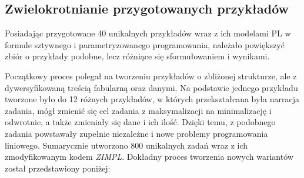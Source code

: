 \subsection{Zwielokrotnianie przygotowanych przykładów}

Posiadając przygotowane 40 unikalnych przykładów wraz z ich modelami PL w formule sztywnego i parametryzowanego programowania, należało powiększyć zbiór o przykłady podobne, lecz różniące się sformułowaniem i wynikami.

Początkowy proces polegał na tworzeniu przykładów o zbliżonej strukturze, ale z dywersyfikowaną treścią fabularną oraz danymi. Na podstawie jednego przykładu tworzone było do 12 różnych przykładów, w których przekształcana była narracja zadania, mógł zmienić się cel zadania z maksymalizacji na minimalizację i odwrotnie, a także zmieniały się dane i ich ilość. Dzięki temu, z podobnego zadania powstawały zupełnie niezależne i nowe problemy programowania liniowego. Sumarycznie utworzono 800 unikalnych zadań wraz z ich zmodyfikowanym kodem  \textit{ZIMPL}. %
Dokładny proces tworzenia nowych wariantów został przedstawiony poniżej:

